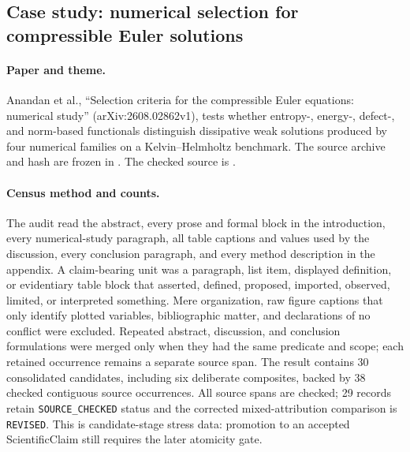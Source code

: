 \subsection{Case study: numerical selection for compressible Euler solutions}
\label{case:2608-02862}

\paragraph{Paper and theme.}
Anandan et al., ``Selection criteria for the compressible Euler equations: numerical study'' (arXiv:2608.02862v1), tests whether entropy-, energy-, defect-, and norm-based functionals distinguish dissipative weak solutions produced by four numerical families on a Kelvin--Helmholtz benchmark. The source archive and hash are frozen in . The checked source is .

\paragraph{Census method and counts.}
The audit read the abstract, every prose and formal block in the introduction, every numerical-study paragraph, all table captions and values used by the discussion, every conclusion paragraph, and every method description in the appendix. A claim-bearing unit was a paragraph, list item, displayed definition, or evidentiary table block that asserted, defined, proposed, imported, observed, limited, or interpreted something. Mere organization, raw figure captions that only identify plotted variables, bibliographic matter, and declarations of no conflict were excluded. Repeated abstract, discussion, and conclusion formulations were merged only when they had the same predicate and scope; each retained occurrence remains a separate source span. The result contains 30 consolidated candidates, including six deliberate composites, backed by 38 checked contiguous source occurrences. All source spans are checked; 29 records retain \texttt{SOURCE\_CHECKED} status and the corrected mixed-attribution comparison is \texttt{REVISED}. This is candidate-stage stress data: promotion to an accepted ScientificClaim still requires the later atomicity gate.

